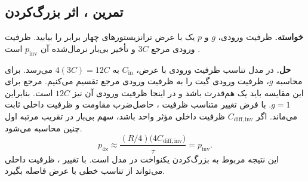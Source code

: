 \subsection{تمرین ، اثر بزرگ‌کردن }
\label{sec:delay-exercise-scaled-inverter}

\textbf{خواسته.}
ظرفیت ورودی، \(g\) و \(p\) یک  با عرض
ترانزیستورهای چهار برابر را بیابید. ظرفیت ورودی مرجع
\(3C\) و تأخیر بی‌بار نرمال‌شده آن \(p_{\mathrm{inv}}\) است
\cite[تمرین ، صفحه ۱۷۷]{weste}.

\textbf{حل.}
در مدل تناسب ظرفیت ورودی با عرض، \(C_{\mathrm{in}}\) به
\(4(3C)=12C\) می‌رسد. برای محاسبه \(g\)،
ظرفیت ورودی گیت را به ظرفیت ورودی مرجع تقسیم می‌کنیم.
مرجع برای این مقایسه باید یک  هم‌قدرت باشد و در اینجا ظرفیت ورودی آن نیز
\(12C\) است. بنابراین \(g=1\). با فرض تغییر متناسب ظرفیت
، حاصل‌ضرب مقاومت و ظرفیت داخلی ثابت می‌ماند.
اگر \(C_{\mathrm{diff,inv}}\) ظرفیت داخلی مؤثر
 واحد باشد، سهم بی‌بار در تقریب مرتبه اول
چنین محاسبه می‌شود.
\[
  p_{\mathrm{4x}}\approx
  \frac{(R/4)\bigl(4C_{\mathrm{diff,inv}}\bigr)}{\tau}
  =p_{\mathrm{inv}}.
\]
این نتیجه مربوط به بزرگ‌کردن یکنواخت در مدل  است.
با تغییر ، ظرفیت داخلی می‌تواند از تناسب خطی
با عرض فاصله بگیرد.
